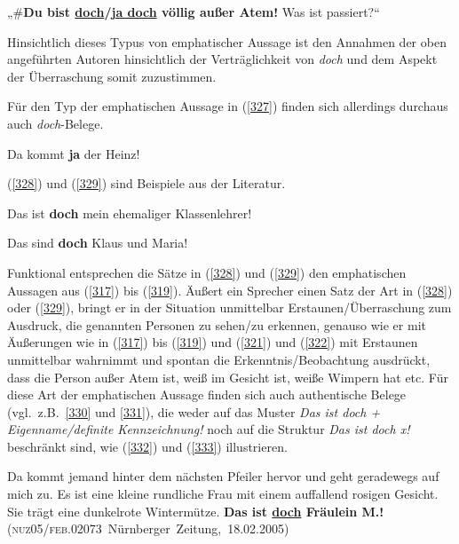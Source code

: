 \begin{exe}
	\ex\label{326}
	„\#\textbf{Du bist \underline{\vphantom{j}doch}/\underline{ja doch} völlig außer Atem!} Was ist passiert?“
\end{exe}
Hinsichtlich dieses Typus von emphatischer Aussage  ist den Annahmen der oben angeführten Autoren hinsichtlich der Verträglichkeit von \textit{doch} und dem Aspekt der Überraschung somit zuzustimmen. 

Für den Typ der emphatischen Aussage in (\ref{327}) finden sich allerdings durchaus auch \textit{doch}-Belege.
	
\begin{exe}
	\ex\label{327} 
	Da kommt \textbf{ja} der Heinz!
	\hfill\hbox{\citet[215]{Thurmair1989}}
\end{exe}		            		
(\ref{328}) und (\ref{329}) sind Beispiele aus der Literatur.

\begin{exe}
	\ex\label{328} 
	Das ist \textbf{doch} mein ehemaliger Klassenlehrer!	
	\hfill\hbox{\citet[196]{Rinas2006}}
\end{exe}

\begin{exe}
	\ex\label{329} 
	Das sind \textbf{doch} Klaus und Maria!	
	\hfill\hbox{\citet[86]{Dahl1988}}
\end{exe}											         
Funktional entsprechen die Sätze in (\ref{328}) und (\ref{329}) den emphatischen Aussagen aus (\ref{317}) bis (\ref{319}). Äußert ein Sprecher einen Satz der Art in (\ref{328}) oder (\ref{329}), bringt er in der Situation unmittelbar Erstaunen/Überraschung zum Ausdruck, die ge\-nannten Personen zu sehen/zu erkennen, genauso wie er mit Äußerungen wie in (\ref{317}) bis (\ref{319}) und (\ref{321}) und (\ref{322}) mit Erstaunen unmittelbar wahrnimmt und spontan die Erkenntnis/Beobachtung ausdrückt, dass die Person außer Atem ist, weiß im Gesicht ist, weiße Wimpern hat etc. Für diese Art der emphatischen Aussage finden sich auch authentische Belege (vgl.\ z.B.\ \ref{330} und \ref{331}), die weder auf das Muster \textit{Das ist doch + Eigenname/definite Kennzeichnung!} noch auf die Struktur \textit{Das ist doch x!} beschränkt sind, wie (\ref{332}) und (\ref{333}) illustrieren.
	
\begin{exe}
	\ex\label{330}
 
	Da kommt jemand hinter dem nächsten Pfeiler hervor und geht geradewegs auf mich zu. Es ist eine kleine rundliche Frau mit einem auffallend rosigen 			Gesicht. Sie trägt eine dunkelrote Wintermütze. \textbf{Das ist \underline{doch} Fräulein M.!}     
	\hfill\hbox{(\textsc{nuz05/feb.02073} Nürnberger Zeitung, 18.02.2005)}	
\end{exe}	
	
